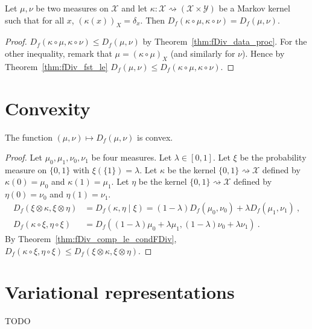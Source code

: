 \begin{lemma}
  \label{lem:fDiv_compProd_prod_eq}
  Let $\mu, \nu$ be two measures on $\mathcal X$ and let $\kappa : \mathcal X \rightsquigarrow (\mathcal X \times \mathcal Y)$ be a Markov kernel such that for all $x$, $(\kappa(x))_X = \delta_x$. Then $D_f(\kappa \circ \mu, \kappa \circ \nu) = D_f(\mu, \nu)$.
\end{lemma}

\begin{proof}
$D_f(\kappa \circ \mu, \kappa \circ \nu) \le D_f(\mu, \nu)$ by Theorem~\ref{thm:fDiv_data_proc}.
For the other inequality, remark that $\mu = (\kappa \circ \mu)_X$ (and similarly for $\nu$). Hence by Theorem~\ref{thm:fDiv_fst_le} $D_f(\mu, \nu) \le D_f(\kappa \circ \mu, \kappa \circ \nu)$.
\end{proof}

\section{Convexity}

\begin{theorem}
  \label{thm:fDiv_convex}
  The function $(\mu, \nu) \mapsto D_f(\mu, \nu)$ is convex.
\end{theorem}

\begin{proof}
Let $\mu_0, \mu_1, \nu_0, \nu_1$ be four measures. Let $\lambda \in [0,1]$. Let $\xi$ be the probability measure on $\{0,1\}$ with $\xi(\{1\}) = \lambda$.
Let $\kappa$ be the kernel $\{0,1\} \rightsquigarrow \mathcal X$ defined by $\kappa(0) = \mu_0$ and $\kappa(1) = \mu_1$.
Let $\eta$ be the kernel $\{0,1\} \rightsquigarrow \mathcal X$ defined by $\eta(0) = \nu_0$ and $\eta(1) = \nu_1$.
\begin{align*}
D_f(\xi \otimes \kappa, \xi \otimes \eta)
&= D_f(\kappa, \eta \mid \xi)
= (1 - \lambda) D_f(\mu_0, \nu_0) + \lambda D_f(\mu_1, \nu_1)
\: , \\
D_f(\kappa \circ \xi, \eta \circ \xi)
&= D_f((1 - \lambda)\mu_0 + \lambda \mu_1, (1 - \lambda)\nu_0 + \lambda \nu_1)
\: .
\end{align*}
By Theorem~\ref{thm:fDiv_comp_le_condFDiv}, $D_f(\kappa \circ \xi, \eta \circ \xi) \le D_f(\xi \otimes \kappa, \xi \otimes \eta)$.
\end{proof}

\section{Variational representations}

TODO